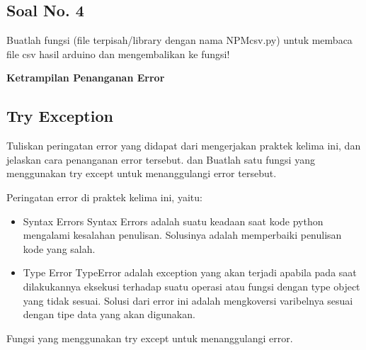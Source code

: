 \subsection{Soal No. 4}
Buatlah fungsi (file terpisah/library dengan nama NPMcsv.py) untuk membaca file csv hasil arduino dan mengembalikan ke fungsi!


\hfill \break
{\Large \textbf{Ketrampilan Penanganan Error}}

\subsection{Try Exception}
Tuliskan  peringatan  error  yang  didapat  dari  mengerjakan  praktek  kelima  ini, dan  jelaskan  cara  penanganan  error  tersebut.   dan  Buatlah  satu  fungsi  yang menggunakan try except untuk menanggulangi error tersebut.

\hfill \break
Peringatan error di praktek kelima ini, yaitu:
\begin{itemize}
	\item Syntax Errors
	Syntax Errors adalah suatu keadaan saat kode python mengalami kesalahan penulisan. Solusinya adalah memperbaiki penulisan kode yang salah.
		
	\item Type Error
	TypeError adalah exception yang akan terjadi apabila pada saat dilakukannya eksekusi terhadap suatu operasi atau fungsi dengan type object yang tidak sesuai. Solusi dari error ini adalah mengkoversi varibelnya sesuai dengan tipe data yang akan digunakan.
\end{itemize}

\hfill \break
Fungsi yang menggunakan try except untuk menanggulangi error.







